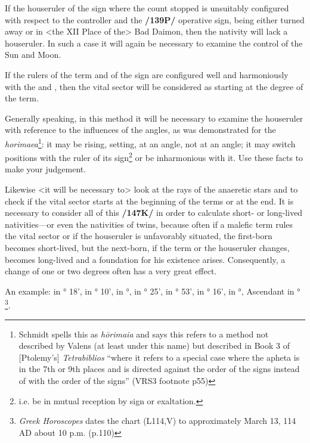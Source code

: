 If the houseruler of the sign where the count stopped is unsuitably configured with respect to the controller and
the \textbf{/139P/} operative sign, being either turned away or in <the XII Place of the> Bad Daimon, then the nativity will lack a houseruler. In such a case it will again be necessary to examine the control of the Sun and Moon. 

If the rulers of the term and of the sign are configured well and harmoniously with the \Sun\xspace and \Moon, then the vital sector will be considered as starting at the degree of the term.

Generally speaking, in this method it will be necessary to examine the houseruler with reference to the influences of the angles, as was demonstrated for the \textsl{horimaea}\footnote{Schmidt spells this as \textsl{h\=orimaia} and says this refers to a method not described by Valens (at least under this name) but described in Book 3 of [Ptolemy's] \textsl{Tetrabiblios} ``where it refers to a special case where the apheta is in the 7th or 9th places and is directed against the order of the signs instead of with the order of the signs'' (VRS3 footnote p55)}: it may be rising, setting, at an angle, not at an angle; it may switch positions with the ruler of its sign\footnote{i.e. be in mutual reception by sign or exaltation.} or be inharmonious with it. Use these facts to make your judgement. 

Likewise <it will be necessary to> look at the rays of the anaeretic stars and to check if the vital sector starts at the beginning of the terms or at the end. It is necessary to consider all of this \textbf{/147K/} in order to calculate short- or long-lived nativities—or even the nativities of twins, because often if a malefic term rules the vital sector or if the houseruler is unfavorably situated, the first-born
becomes short-lived, but the next-born, if the term or the houseruler changes, becomes long-lived and a foundation for his existence arises. Consequently, a change of one or two degrees often has a very great effect.

An example: \Sun\xspace in \Taurus\xspace 25° 18', \Moon\xspace in \Aquarius\xspace 7° 10', \Saturn\xspace in \Aries\xspace 24°, \Jupiter\xspace in \Taurus\xspace 4° 25', \Mars\xspace in \Cancer\xspace 22° 53', \Venus\xspace in \Gemini\xspace 28° 16', \Mercury\xspace in \Gemini\xspace 6°, Ascendant in \Capricorn\xspace 27°
\footnote{\textit{Greek Horoscopes} dates the chart (L114,V) to approximately March 13, 114 AD about 10 p.m. (p.110)}. 

